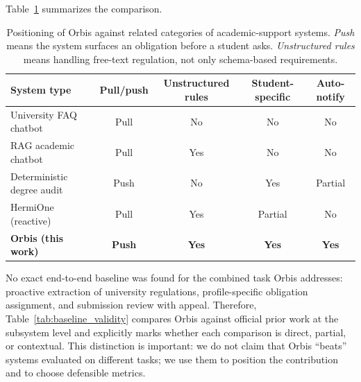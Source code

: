 \documentclass[a4paper,12pt]{article}
\begin{document}
Table~\ref{tab:related_work} summarizes the comparison.

\begin{table}[H]
\centering
\small
\begin{tabular}{lcccc}
\toprule
System type & Pull/push & Unstructured rules & Student-specific & Auto-notify \\ \midrule
University FAQ chatbot     & Pull & No  & No  & No  \\
RAG academic chatbot       & Pull & Yes & No  & No  \\
Deterministic degree audit & Push & No  & Yes & Partial \\
HermiOne (reactive)        & Pull & Yes & Partial & No \\
\textbf{Orbis (this work)} & \textbf{Push} & \textbf{Yes} & \textbf{Yes} & \textbf{Yes} \\
\bottomrule
\end{tabular}
\caption{Positioning of Orbis against related categories of academic-support systems. \emph{Push} means the system surfaces an obligation before a student asks. \emph{Unstructured rules} means handling free-text regulation, not only schema-based requirements.}
\label{tab:related_work}
\end{table}

No exact end-to-end baseline was found for the combined task Orbis addresses: proactive extraction of university regulations, profile-specific obligation assignment, and submission review with appeal. Therefore, Table~\ref{tab:baseline_validity} compares Orbis against official prior work at the subsystem level and explicitly marks whether each comparison is direct, partial, or contextual. This distinction is important: we do not claim that Orbis ``beats'' systems evaluated on different tasks; we use them to position the contribution and to choose defensible metrics.
\end{document}
